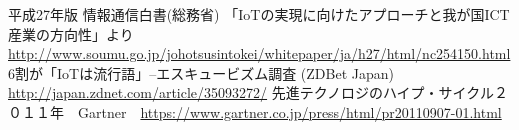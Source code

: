 
\begin{thebibliography}{99}
 平成27年版 情報通信白書(総務省) 「IoTの実現に向けたアプローチと我が国ICT産業の方向性」より \url{http://www.soumu.go.jp/johotsusintokei/whitepaper/ja/h27/html/nc254150.html}
 6割が「IoTは流行語」--エスキュービズム調査 (ZDBet Japan) \url{http://japan.zdnet.com/article/35093272/}
 先進テクノロジのハイプ・サイクル２０１１年　Gartner　\url{https://www.gartner.co.jp/press/html/pr20110907-01.html}
\end{thebibliography}
